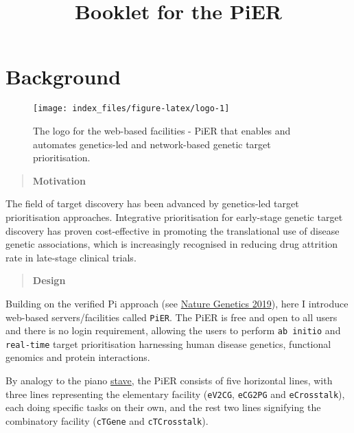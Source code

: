 \documentclass[
  oneside]{book}
\title{Booklet for the PiER}
\author{}
\date{\vspace{-2.5em}}
\begin{document}
\maketitle

{
\setcounter{tocdepth}{2}
\tableofcontents
}
\hypertarget{index}{%
\chapter{Background}\label{index}}

\begin{figure}

{\centering \texttt{[image: index\_files/figure-latex/logo-1]} 

}

\caption{The logo for the web-based facilities - PiER that enables and automates genetics-led and network-based genetic target prioritisation.}\label{fig:logo}
\end{figure}

\begin{quote}
\textbf{Motivation}
\end{quote}

The field of target discovery has been advanced by genetics-led target prioritisation approaches. Integrative prioritisation for early-stage genetic target discovery has proven cost-effective in promoting the translational use of disease genetic associations, which is increasingly recognised in reducing drug attrition rate in late-stage clinical trials.

\begin{quote}
\textbf{Design}
\end{quote}

Building on the verified Pi approach (see \href{https://www.ncbi.nlm.nih.gov/pubmed/31253980}{Nature Genetics 2019}), here I introduce web-based servers/facilities called \texttt{PiER}. The PiER is free and open to all users and there is no login requirement, allowing the users to perform \texttt{ab\ initio} and \texttt{real-time} target prioritisation harnessing human disease genetics, functional genomics and protein interactions.

By analogy to the piano \href{https://www.piano-keyboard-guide.com/grand-staff.html}{stave}, the PiER consists of five horizontal lines, with three lines representing the elementary facility (\texttt{eV2CG}, \texttt{eCG2PG} and \texttt{eCrosstalk}), each doing specific tasks on their own, and the rest two lines signifying the combinatory facility (\texttt{cTGene} and \texttt{cTCrosstalk}).
\end{document}
